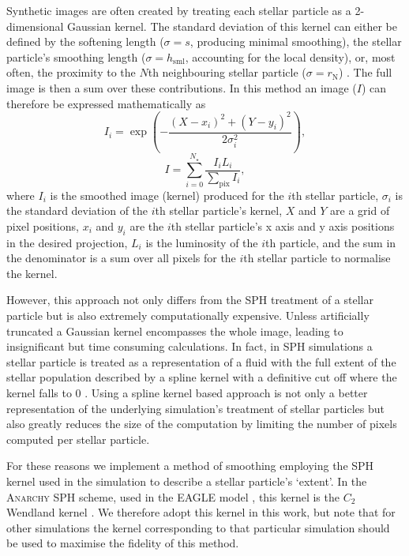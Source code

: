 Synthetic images are often created by treating each stellar particle as a 2-dimensional Gaussian kernel. The standard deviation of this kernel can either be defined by the softening length ($\sigma=s$, producing minimal smoothing), the stellar particle's smoothing length ($\sigma=h_{\mathrm{sml}}$, accounting for the local density), or, most often, the proximity to the $N$th neighbouring stellar particle ($\sigma=r_{\mathrm{N}}$) \cite[e.g.][]{Torrey2015,Ma_18_size,Marshall21}. The full image is then a sum over these contributions. In this method an image ($I$) can therefore be expressed mathematically as
\begin{equation}
I_i =  \exp\left(-\frac{(X-x_i)^2 + (Y-y_i)^2}{2\sigma_{i}^2}\right),
\end{equation}
\begin{equation}
I = \sum_{i=0}^{N_\star} \frac{I_i L_i}{\sum_{\mathrm{pix}}I_i},
\end{equation}
where $I_i$ is the smoothed image (kernel) produced for the $i$th stellar particle, $\sigma_i$ is the standard deviation of the $i$th stellar particle's kernel, $X$ and $Y$ are a grid of pixel positions, $x_i$ and $y_i$ are the $i$th stellar particle's x axis and y axis positions in the desired projection, $L_i$ is the luminosity of the $i$th particle, and the sum in the denominator is a sum over all pixels for the $i$th stellar particle to normalise the kernel. 

However, this approach not only differs from the SPH treatment of a stellar particle but is also extremely computationally expensive. Unless artificially truncated a Gaussian kernel encompasses the whole image, leading to insignificant but time consuming calculations. 
In fact, in SPH simulations a stellar particle is treated as a representation of a fluid with the full extent of the stellar population described by a spline kernel with a definitive cut off where the kernel falls to 0 \citep{Borrow2021}. Using a spline kernel based approach is not only a better representation of the underlying simulation's treatment of stellar particles but also greatly reduces the size of the computation by limiting the number of pixels computed per stellar particle.

For these reasons we implement a method of smoothing employing the SPH kernel used in the simulation to describe a stellar particle's `extent'. In the \textsc{Anarchy} SPH scheme, used in the EAGLE model \citep{schaye_eagle_2015}, this kernel is the $C_{2}$ Wendland kernel \citep{wendland_piecewise_1995, Dehnen2012}. We therefore adopt this kernel in this work, but note that for other simulations the kernel corresponding to that particular simulation should be used to maximise the fidelity of this method.

